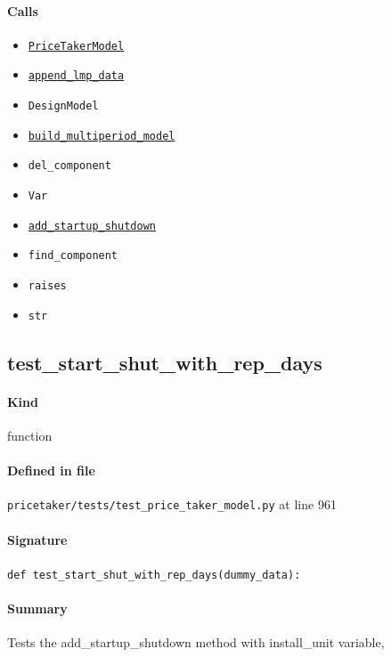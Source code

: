 \documentclass[11pt]{report}
\begin{document}
\paragraph{Calls}
\begin{itemize}[leftmargin=*]
  \item \hyperref[def:pricetaker-price_taker_model.py:PriceTakerModel:L161]{\texttt{PriceTakerModel}}
  \item \hyperref[def:pricetaker-price_taker_model.py:PriceTakerModel.append_lmp_data:L221]{\texttt{append\_lmp\_data}}
  \item \texttt{DesignModel}
  \item \hyperref[def:pricetaker-price_taker_model.py:PriceTakerModel.build_multiperiod_model:L291]{\texttt{build\_multiperiod\_model}}
  \item \texttt{del\_component}
  \item \texttt{Var}
  \item \hyperref[def:pricetaker-price_taker_model.py:PriceTakerModel.add_startup_shutdown:L813]{\texttt{add\_startup\_shutdown}}
  \item \texttt{find\_component}
  \item \texttt{raises}
  \item \texttt{str}
\end{itemize}
\subsection{test\_start\_shut\_with\_rep\_days}
\label{def:pricetaker-tests-test_price_taker_model.py:test_start_shut_with_rep_days:L961}
\paragraph{Kind} function
\paragraph{Defined in file} \texttt{pricetaker/tests/test\_price\_taker\_model.py} at line 961
\paragraph{Signature} \texttt{def test\_start\_shut\_with\_rep\_days(dummy\_data):}
\paragraph{Summary} Tests the add\_startup\_shutdown method with install\_unit variable,
\end{document}
